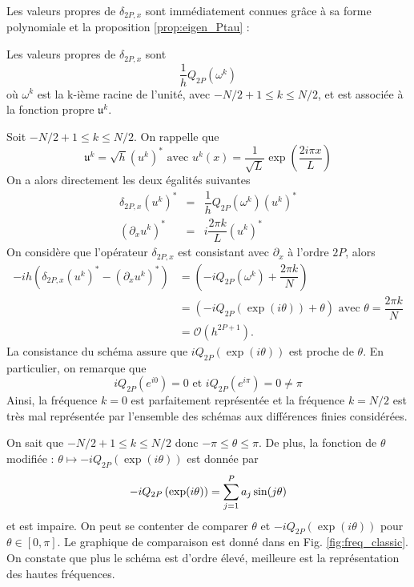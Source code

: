 Les valeurs propres de $\delta_{2P,x}$ sont immédiatement connues grâce à sa forme polynomiale et la proposition \ref{prop:eigen_Ptau} :
\begin{proposition}
Les valeurs propres de $\delta_{2P,x}$ sont
\begin{equation}
\dfrac{1}{h}Q_{2P}(\omega^k)
\end{equation}
où $\omega^k$ est la k-ième racine de l'unité, avec $-N/2+1 \leq k \leq N/2$, et est associée à la fonction propre $\mathfrak{u}^k$.
\end{proposition}

Soit $-N/2+1 \leq k \leq N/2$. On rappelle que
\begin{equation}
\mathfrak{u}^k = \sqrt{h}(u^k)^* \text{ avec } u^k(x)=\dfrac{1}{\sqrt{L}} \exp \left( \dfrac{2 i \pi x}{L} \right)
\end{equation}
On a alors directement les deux égalités suivantes 
\begin{equation*}
\begin{array}{rcl}
\delta_{2P,x} (u^k)^* & = & \dfrac{1}{h}Q_{2P} (\omega^k) (u^k)^*\\
(\partial_x u^k)^* & = & i \dfrac{2 \pi k}{L} (u^k)^*
\end{array}
\end{equation*}
On considère que l'opérateur $\delta_{2P,x}$ est consistant avec $\partial_x$ à l'ordre $2P$, alors
\begin{align*}
-ih \left( \delta_{2P,x} (u^k)^* - (\partial_x u^k)^* \right) & = \left( -i Q_{2P}(\omega^k) + \dfrac{2 \pi k}{N} \right) \\
	& = \left( -i Q_{2P}\left( \exp(i \theta) \right) + \theta \right) \text{ avec } \theta = \dfrac{2 \pi k}{N}\\
	& = \mathcal{O} \left( h^{2P+1} \right).
\end{align*}
La consistance du schéma assure que $i Q_{2P}\left( \exp(i \theta) \right)$ est proche de $\theta$. En particulier, on remarque que
\begin{equation}
 i Q_{2P}(e^{i0}) = 0 \text{ et }  i Q_{2P}(e^{i \pi}) = 0 \neq \pi
\end{equation}
Ainsi, la fréquence $k=0$ est parfaitement représentée et la fréquence $k = N/2$ est très mal représentée par l'ensemble des schémas aux différences finies considérées.

On sait que $-N/2+1 \leq k \leq N/2$ donc $-\pi \leq \theta \leq \pi$. De plus, la fonction de $\theta$ modifiée : $\theta \mapsto -i Q_{2P}\left( \exp(i \theta) \right)$  est donnée par
\begin{equation}
-i Q_{2P}\left( \exp(i \theta) \right) = \displaystyle\sum\limits_{j=1}^P a_j \sin(j \theta)
\end{equation}
et est impaire. On peut se contenter de comparer $\theta$ et $-i Q_{2P}\left( \exp(i \theta) \right)$ pour $\theta \in [0 , \pi]$. Le graphique de comparaison est donné dans en Fig. \ref{fig:freq_classic}. On constate que plus le schéma est d'ordre élevé, meilleure est la représentation des hautes fréquences.


